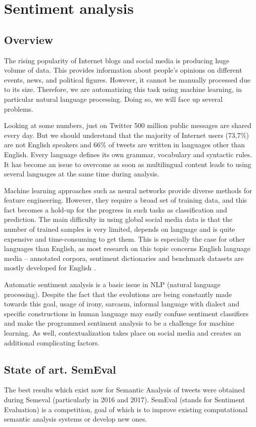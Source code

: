 \documentclass[12pt,a4paper]{article}
\begin{document}
\section{Sentiment analysis}
\subsection{Overview}
The rising popularity of Internet blogs and social media is producing huge volume of data. This provides information about people’s opinions on different events, news, and political figures. However, it cannot be manually processed due to its size. Therefore, we are automatizing this task using machine learning, in particular natural language processing. Doing so, we will face up several problems.

Looking at some numbers, just on Twitter 500 million public messages are shared every day. But we should understand that the majority of Internet users (73,7\%) are not English speakers and 66\% of tweets are written in languages other than English. Every language defines its own grammar, vocabulary and syntactic rules. It has become an issue to overcome as soon as multilingual content leads to using several languages at the same time during analysis.

Machine learning approaches such as neural networks provide diverse methods for feature engineering. However, they require a broad set of training data, and this fact becomes a hold-up for the progress in such tasks as classification and prediction. The main difficulty in using global social media data is that the number of trained samples is very limited, depends on language and is quite expensive and time-consuming to get them. This is especially the case for other languages than English, as most research on this topic concerns English language media – annotated corpora, sentiment dictionaries and benchmark datasets are mostly developed for English \cite{SemEval2017}.

Automatic sentiment analysis is a basic issue in NLP (natural language processing). Despite the fact that the evolutions are being constantly made towards this goal, usage of irony, sarcasm, informal language with dialect and specific constructions in human language may easily confuse sentiment classifiers and make the programmed sentiment analysis to be a challenge for machine learning. As well, contextualization takes place on social media and creates an additional complicating factors.  

\subsection{State of art. SemEval}
The best results which exist now for Semantic Analysis of tweets were obtained during Semeval (particularly in 2016 and 2017). SemEval (stands for Sentiment Evaluation) is a competition, goal of which is to improve existing computational semantic analysis systems or develop new ones.
\end{document}
